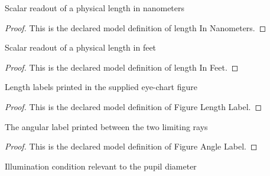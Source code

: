 \begin{definition}
  \label{def:physics:phyx-mini-0075:phyxminiproblems-problemphyxmini0075-lengthinnanometers}
  Scalar readout of a physical length in nanometers
\end{definition}
\begin{proof}
  This is the declared model definition of length In Nanometers.
\end{proof}
\begin{definition}
  \label{def:physics:phyx-mini-0075:phyxminiproblems-problemphyxmini0075-lengthinfeet}
  Scalar readout of a physical length in feet
\end{definition}
\begin{proof}
  This is the declared model definition of length In Feet.
\end{proof}
\begin{definition}
  \label{def:physics:phyx-mini-0075:phyxminiproblems-problemphyxmini0075-figurelengthlabel}
  Length labels printed in the supplied eye-chart figure
\end{definition}
\begin{proof}
  This is the declared model definition of Figure Length Label.
\end{proof}
\begin{definition}
  \label{def:physics:phyx-mini-0075:phyxminiproblems-problemphyxmini0075-figureanglelabel}
  The angular label printed between the two limiting rays
\end{definition}
\begin{proof}
  This is the declared model definition of Figure Angle Label.
\end{proof}
\begin{definition}
  \label{def:physics:phyx-mini-0075:phyxminiproblems-problemphyxmini0075-lightingcondition}
  Illumination condition relevant to the pupil diameter
\end{definition}
